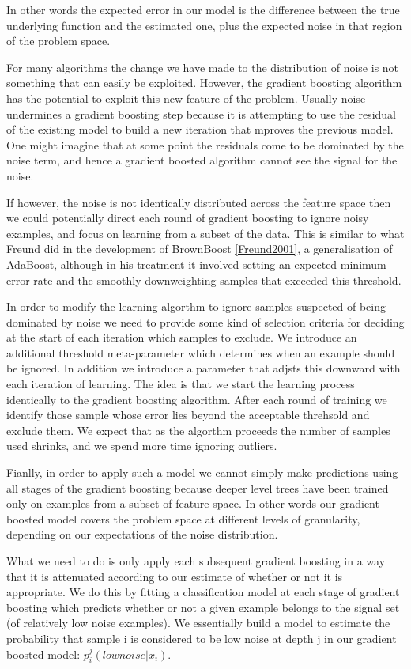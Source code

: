 \documentclass[11pt,twoside,a4paper]{article}
\begin{document}
In other words the expected error in our model is the difference between the true underlying function and the estimated one, 
plus the expected noise in that region of the problem space.

For many algorithms the change we have made to the distribution of noise is not something that can easily be exploited.
However, the gradient boosting algorithm has the potential to exploit this new feature of the problem. Usually noise undermines
a gradient boosting step because it is attempting to use the residual of the existing model to build a new iteration that
mproves the previous model. One might imagine that at some point the residuals come to be dominated by the noise term, and hence a
gradient boosted algorithm cannot see the signal for the noise.

If however, the noise is not identically distributed across the feature space then we could potentially direct each round of 
gradient boosting to ignore noisy examples, and focus on learning from a subset of the data. This is similar to what Freund
did in the development of BrownBoost \ref{Freund2001}, a generalisation of AdaBoost, although in his treatment it involved 
setting an expected minimum error rate and the smoothly downweighting samples that exceeded this threshold.  

In order to modify the learning algorthm to ignore samples suspected of being dominated by noise we need to provide some 
kind of selection criteria for deciding at the start of each iteration which samples to exclude.
We introduce an additional threshold meta-parameter which determines when an example should be ignored.
In addition we introduce a parameter that adjsts this downward with each iteration of learning. The idea is that we start the
learning process identically to the gradient boosting algorithm. After each round of training we identify those sample whose
error lies beyond the acceptable threhsold and exclude them. We expect that as the algorthm proceeds the number of samples used
shrinks, and we spend more time ignoring outliers.

Fianlly, in order to apply such a model we cannot simply make predictions using all stages of the gradient boosting because
deeper level trees have been trained only on examples from a subset of feature space. In other words our gradient boosted model
covers the problem space at different levels of granularity, depending on our expectations of the noise distribution.

What we need to do is only apply each subsequent gradient boosting in a way that it is attenuated according to our estimate of
whether or not it is appropriate. We do this by fitting a classification model at each stage of gradient boosting which predicts 
whether or not a given example belongs to the signal set (of relatively low noise examples). We essentially build a model to estimate
the probability that sample i is considered to be low noise at depth j in our gradient boosted model: $p_i^j(low noise | x_i )$.
\end{document}

